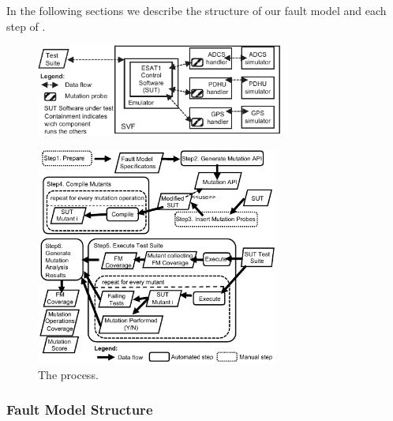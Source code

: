
In the following sections we describe the structure of our fault model and each step of \APPR.

\begin{figure}[h]
	\centering
		\includegraphics[width=8.4cm]{damat/images/dataMutationExample}
		\caption{}
		\label{fig:appr:mutateProbesInserted}
	\end{figure}

\begin{figure}[h]
	\centering
		\includegraphics[width=8cm]{damat/images/dataDrivenBufferProcess}
		\caption{The \APPR process.}
		\label{fig:appr:approach}
	\end{figure}


\subsubsection{Fault Model Structure}
\label{sec:faultModelStructure}





